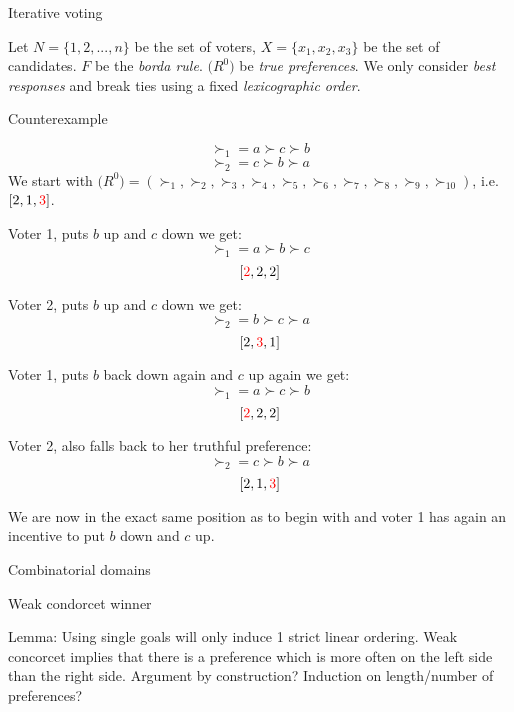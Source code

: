 \documentclass[12pt]{article}
\newenvironment{question}[2][Question]{\begin{trivlist}
\item[\hskip \labelsep {\bfseries #1}\hskip \labelsep {\bfseries #2.}]}{\end{trivlist}}
\newenvironment{answer}[2][Answer]{\begin{trivlist}
\item[\hskip \labelsep {\bfseries #1}\hskip \labelsep {\bfseries #2:}]}{\end{trivlist}}
\begin{document}
\begin{question}{2}{Iterative voting}

Let $N=\{1,2, ..., n\}$ be the set of voters, $X=\{x_1,x_2,x_3\}$ be the set of candidates. $F$ be the \textit{borda rule}. $\boldsymbol(R^0)$ be \textit{true preferences}. We only consider \textit{best responses} and break ties using a fixed \textit{lexicographic order}.
\end{question}

\begin{answer}{a)}{Counterexample}

$$\succ_1=a\succ c\succ b$$
$$\succ_2=c\succ b\succ a$$
We start with $\boldsymbol(R^0)=(\succ_1,\succ_2,\succ_3,\succ_4,\succ_5,\succ_6,\succ_7,\succ_8,\succ_9,\succ_10)$, i.e. $[2,1,\textcolor{red}{3}]$.

Voter 1, puts $b$ up and $c$ down we get:
$$\succ_1=a\succ b\succ c$$
$$[\textcolor{red}{2},2,2]$$

Voter 2, puts $b$ up and $c$ down we get:
$$\succ_2=b\succ c\succ a$$
$$[2,\textcolor{red}{3},1]$$

Voter 1, puts $b$ back down again and $c$ up again we get:
$$\succ_1=a\succ c\succ b$$
$$[\textcolor{red}{2},2,2]$$

Voter 2, also falls back to her truthful preference:
$$\succ_2=c\succ b\succ a$$
$$[2,1,\textcolor{red}{3}]$$

We are now in the exact same position as to begin with and voter 1 has again an incentive to put $b$ down and $c$ up.
\end{answer}

\begin{question}{3}{Combinatorial domains}


\end{question}

\begin{answer}{a)}{Weak condorcet winner}

Lemma: Using single goals will only induce 1 strict linear ordering.
Weak concorcet implies that there is a preference which is more often on the left side than the right side.
Argument by construction? Induction on length/number of preferences?


\end{answer}
\end{document}
